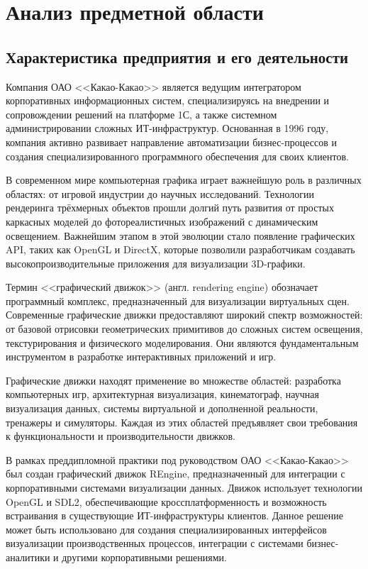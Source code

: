 \section{Анализ предметной области}
\subsection{Характеристика предприятия и его деятельности}

Компания ОАО <<Какао-Какао>> является ведущим интегратором корпоративных информационных систем, специализируясь на внедрении и сопровождении решений на платформе 1С, а также системном администрировании сложных ИТ-инфраструктур. Основанная в 1996 году, компания активно развивает направление автоматизации бизнес-процессов и создания специализированного программного обеспечения для своих клиентов.

В современном мире компьютерная графика играет важнейшую роль в различных областях: от игровой индустрии до научных исследований. Технологии рендеринга трёхмерных объектов прошли долгий путь развития от простых каркасных моделей до фотореалистичных изображений с динамическим освещением. Важнейшим этапом в этой эволюции стало появление графических API, таких как OpenGL и DirectX, которые позволили разработчикам создавать высокопроизводительные приложения для визуализации 3D-графики.

Термин <<графический движок>> (англ. rendering engine) обозначает программный комплекс, предназначенный для визуализации виртуальных сцен. Современные графические движки предоставляют широкий спектр возможностей: от базовой отрисовки геометрических примитивов до сложных систем освещения, текстурирования и физического моделирования. Они являются фундаментальным инструментом в разработке интерактивных приложений и игр.

Графические движки находят применение во множестве областей: разработка компьютерных игр, архитектурная визуализация, кинематограф, научная визуализация данных, системы виртуальной и дополненной реальности, тренажеры и симуляторы. Каждая из этих областей предъявляет свои требования к функциональности и производительности движков.

В рамках преддипломной практики под руководством ОАО <<Какао-Какао>> был создан графический движок REngine, предназначенный для интеграции с корпоративными системами визуализации данных. Движок использует технологии OpenGL и SDL2, обеспечивающие кроссплатформенность и возможность встраивания в существующие ИТ-инфраструктуры клиентов. Данное решение может быть использовано для создания специализированных интерфейсов визуализации производственных процессов, интеграции с системами бизнес-аналитики и другими корпоративными решениями.

